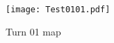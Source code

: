 \documentclass[a4paper]{article}
\begin{document}
\begin{figure}
\texttt{[image: Test0101.pdf]}
\caption{Turn 01 map}
\end{figure}
\end{document}
